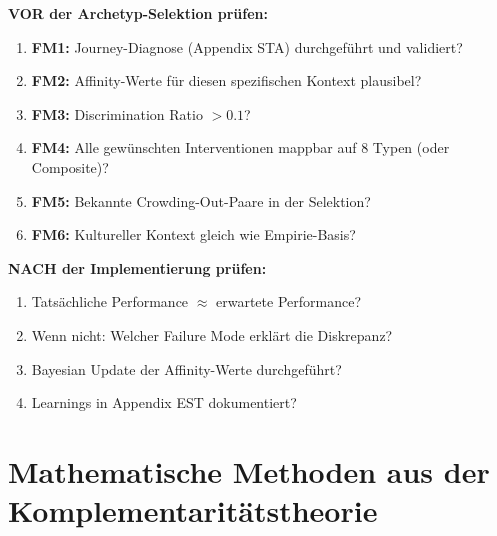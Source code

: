 \begin{tcolorbox}[colback=blue!5!white, colframe=blue!75!black,
    title=\textbf{Checkliste: Failure Mode Detection}]

\textbf{VOR der Archetyp-Selektion prüfen:}

\begin{enumerate}[nosep]
    \item[$\square$] \textbf{FM1:} Journey-Diagnose (Appendix STA) durchgeführt und validiert?
    \item[$\square$] \textbf{FM2:} Affinity-Werte für diesen spezifischen Kontext plausibel?
    \item[$\square$] \textbf{FM3:} Discrimination Ratio $> 0.1$?
    \item[$\square$] \textbf{FM4:} Alle gewünschten Interventionen mappbar auf 8 Typen (oder Composite)?
    \item[$\square$] \textbf{FM5:} Bekannte Crowding-Out-Paare in der Selektion?
    \item[$\square$] \textbf{FM6:} Kultureller Kontext gleich wie Empirie-Basis?
\end{enumerate}

\textbf{NACH der Implementierung prüfen:}

\begin{enumerate}[nosep]
    \item[$\square$] Tatsächliche Performance $\approx$ erwartete Performance?
    \item[$\square$] Wenn nicht: Welcher Failure Mode erklärt die Diskrepanz?
    \item[$\square$] Bayesian Update der Affinity-Werte durchgeführt?
    \item[$\square$] Learnings in Appendix EST dokumentiert?
\end{enumerate}

\end{tcolorbox}


\section{Mathematische Methoden aus der Komplementaritätstheorie}
\label{sec:hhh-complementarity-methods}

